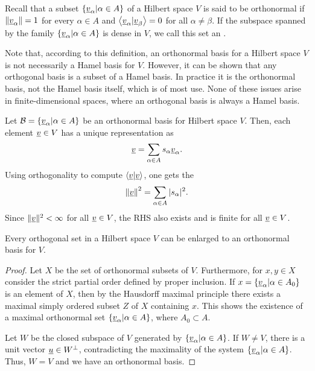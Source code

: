 \begin{definition}
Recall that a subset $\left\{ \underline{v}_{\alpha} | \alpha \in A \right\}$ of a Hilbert space $V$ is said to be orthonormal if $\left\| \underline{v}_{\alpha} \right\| = 1$ for every $\alpha \in A$ and $\left\langle \underline{v}_{\alpha} | \underline{v}_{\beta} \right\rangle = 0$ for all $\alpha \neq \beta$.
If the subspace spanned by the family $\left\{ \underline{v}_{\alpha} | \alpha \in A \right\}$ is dense in $V$, we call this set an .
\end{definition}

Note that, according to this definition, an orthonormal basis for a Hilbert space $V$ is not necessarily a Hamel basis for $V$.
However, it can be shown that any orthogonal basis is a subset of a Hamel basis.
In practice it is the orthonormal basis, not the Hamel basis itself, which is of most use.
None of these issues arise in finite-dimensional spaces, where an orthogonal basis is always a Hamel basis.

Let $\mathcal{B} = \left\{ \underline{v}_{\alpha} | \alpha \in A \right\}$ be an orthonormal basis for Hilbert space $V$.
Then, each element $\underline{v} \in V$ has a unique representation as
\begin{equation*}
\underline{v} = \sum_{\alpha \in A} s_{\alpha} \underline{v}_{\alpha}.
\end{equation*}
Using orthogonality to compute $\left\langle \underline{v} | \underline{v} \right\rangle$, one gets the 
\begin{equation*}
\left\| \underline{v} \right\|^2 = \sum_{\alpha \in A} | s_{\alpha} |^2.
\end{equation*}
Since $\| \underline{v} \|^2 < \infty$ for all $\underline{v} \in V$, the RHS also exists and is finite for all $\underline{v} \in V$.

\begin{theorem}
Every orthogonal set in a Hilbert space $V$ can be enlarged to an orthonormal basis for $V$.
\end{theorem}
\begin{proof}
Let $X$ be the set of orthonormal subsets of $V$.
Furthermore, for $x, y \in X$ consider the strict partial order defined by proper inclusion.
If $x = \left\{ \underline{v}_{\alpha} | \alpha \in A_0 \right\}$ is an element of $X$, then by the Hausdorff maximal principle there exists a maximal simply ordered subset $Z$ of $X$ containing $x$.
This shows the existence of a maximal orthonormal set $\left\{ \underline{v}_{\alpha} | \alpha \in A \right\}$, where $A_0 \subset A$.

Let $W$ be the closed subspace of $V$ generated by $\left\{ \underline{v}_{\alpha} | \alpha \in A \right\}$.
If $W \neq V$, there is a unit vector $\underline{u} \in W^{\bot}$, contradicting the maximality of the system $\left\{ \underline{v}_{\alpha} | \alpha \in A \right\}$.
Thus, $W = V$ and we have an orthonormal basis.
\end{proof}


